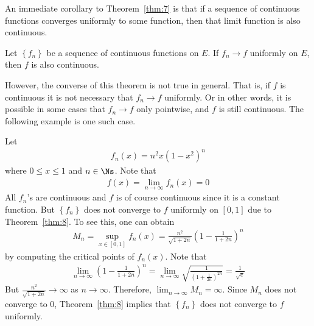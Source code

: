 \documentclass[thmcnt=section, 12pt]{elegantbook}
\begin{document}

\par An immediate corollary to Theorem~\ref{thm:7} is that if a sequence of continuous functions converges uniformly to some function, then that limit function is also continuous.

\begin{theorem} \label{thm:11}
    Let $\left\{f_n\right\}$ be a sequence of continuous functions on $E$. If $f_n \to f$ uniformly on $E$, then $f$ is also continuous.
\end{theorem}

\begin{remark}
    However, the converse of this theorem is not true in general. That is, if $f$ is continuous it is not necessary that $f_n \to f$ uniformly. Or in other words, it is possible in some cases that $f_n \to f$ only pointwise, and $f$ is still continuous. The following example is one such case.
\end{remark}

\begin{example} \label{eg:1}
    Let
    \begin{align*}
        f_n(x) = n^2 x (1 - x^2)^n
    \end{align*}
    where $0 \leq x \leq 1$ and $n \in \Ns$. Note that 
    \begin{align*}
        f(x) = \lim_{n \to \infty} f_n(x) = 0
    \end{align*}
    All $f_n$'s are continuous and $f$ is of course continuous since it is a constant function. But $\left\{f_n\right\}$ does not converge to $f$ uniformly on $[0,1]$ due to Theorem~\ref{thm:8}. To see this, one can obtain
    \begin{align*}
        M_n = \sup_{x \in [0,1]} f_n(x)
        = \frac{n^2}{\sqrt{1 + 2n}} \left(1 - \frac{1}{1+2n}\right)^n 
    \end{align*}
    by computing the critical points of $f_n(x)$. Note that 
    \begin{align*}
        \lim_{n \to \infty} \left(1 - \frac{1}{1+2n}\right)^n
        = \lim_{n \to \infty} \sqrt{\frac{1}{\left(1 + \frac{1}{2n}\right)^{2n}}}
        = \frac{1}{\sqrt{e}}
    \end{align*}
    But $\frac{n^2}{\sqrt{1 + 2n}} \to \infty$ as $n \to \infty$. Therefore, $\lim_{n \to \infty} M_n = \infty$. Since $M_n$ does not converge to $0$, Theorem~\ref{thm:8} implies that $\left\{f_n\right\}$ does not converge to $f$ uniformly.
\end{example}
\end{document}
